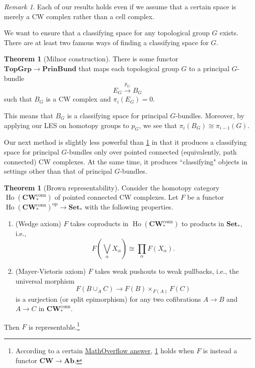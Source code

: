 \documentclass[10pt,letterpaper,cm]{nupset}
\theoremstyle{definition}
\theoremstyle{theorem}
\newtheorem{theorem}[defn]{Theorem}
\theoremstyle{remark}
\newtheorem{remark}[defn]{Remark}
\newcommand{\1}{\mathbb{1}}
\newcommand{\0}{\vec 0}
\DeclareMathOperator{\ho}{Ho}
\DeclareMathOperator{\op}{op}
\newcommand{\be}{\begin{enumerate}}
\newcommand{\ee}{\end{enumerate}}
\begin{document}
\begin{remark}
Each of our results holds even if we assume that a certain space is merely a CW complex rather than a cell complex. 
\end{remark}

\medskip

We want to ensure that a classifying space for any topological group $G$ exists. There are at least two famous ways of finding a classifying space for $G$.

\begin{theorem}[Milnor construction]\label{MC}
There is some functor $\mathbf{TopGrp} \to \mathbf{PrinBund}$ that maps each topological group $G$ to a principal $G$-bundle $$E_G \overset{p_G}{\longrightarrow} B_G$$ such that $B_G$ is a CW complex and $\pi_i\left(E_G\right) =0$.
\end{theorem}

This means that $B_G$ is a classifying space for principal $G$-bundles.
Moreover, by applying our LES on homotopy groups to $p_G$, we see that  $\pi_i\left(B_G\right) \cong \pi_{i-1}\left(G\right)$.

\medskip

Our next method is slightly less powerful than \cref{MC} in that  it produces a classifying space for principal $G$-bundles only over pointed connected (equivalently, path connected) CW complexes. At the same time, it produces ``classifying" objects in settings other than that of principal $G$-bundles.

\begin{theorem}[Brown representability]\label{BR} Consider the homotopy category $\ho(\mathbf{CW}_{\ast}^{\text{conn}})$  of pointed connected CW complexes. Let $F$ be a functor $\ho(\mathbf{CW}_{\ast}^{\text{conn}})^{\op} \to \mathbf{Set}_{\ast}$ with the following properties. 
\be[label=(\roman*)]
\item (Wedge axiom) $F$ takes coproducts in $\ho(\mathbf{CW}_{\ast}^{\text{conn}})$ to products in $\mathbf{Set}_{\ast}$, i.e., 
\[
F\left(\bigvee_{\alpha}X_{\alpha}\right) \cong \prod_{\alpha}F(X_{\alpha}).
\]
\item (Mayer-Vietoris axiom) $F$ takes weak pushouts to weak pullbacks, i.e., the universal morphism
\[
F(B\cup_A C) \to F(B)\times_{F(A)} F(C)
\] is a surjection (or split epimorphism) for any two cofibrations $A \to B$ and $A \to C$ in $\mathbf{CW}_{\ast}^{\text{conn}}$.
\ee
Then $F$ is representable.\footnote{According to a certain \href{https://mathoverflow.net/q/11523}{MathOverflow answer}, \cref{BR} holds when $F$ is instead a functor $\mathbf{CW} \to \mathbf{Ab}$.}

\end{theorem}
\end{document}
